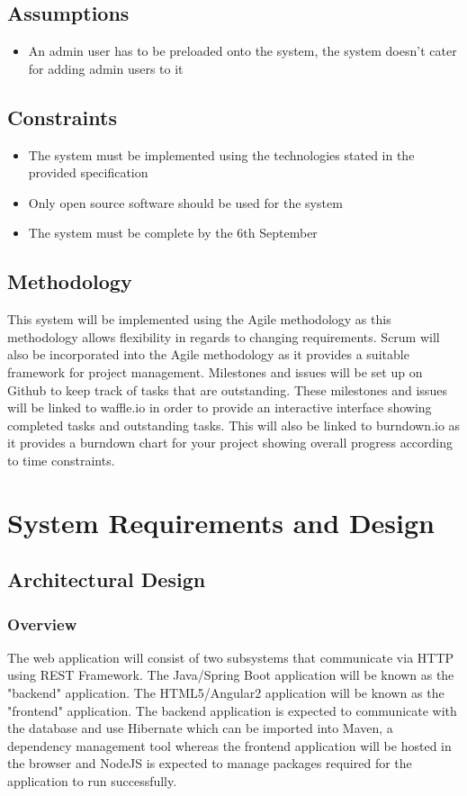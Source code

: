 \documentclass[a4paper,10pt]{article}
\begin{document}
\subsection{Assumptions}
\begin{itemize}
	\item An admin user has to be preloaded onto the system, the system doesn’t cater for adding admin users to it
\end{itemize}

\subsection{Constraints}
\begin{itemize}
	\item The system must be implemented using the technologies stated in the provided specification
	\item Only open source software should be used for the system
	\item The system must be complete by the 6th September
\end{itemize}

\subsection{Methodology}
This system will be implemented using the Agile methodology as this methodology allows flexibility in regards to changing requirements. Scrum will also be incorporated into the Agile methodology as it provides a suitable framework for project management. Milestones and issues will be set up on Github to keep track of tasks that are outstanding. These milestones and issues will be linked to waffle.io in order to provide an interactive interface showing completed tasks and outstanding tasks. This will also be linked to burndown.io as it provides a burndown chart for your project showing overall progress according to time constraints.

\section{System Requirements and Design}
\subsection {Architectural Design}
\subsubsection{Overview}
The web application will consist of two subsystems that communicate via HTTP using REST Framework. The Java/Spring Boot application will be known as the "backend" application. The HTML5/Angular2 application will be known as the "frontend" application. The backend application is expected to communicate with the database and use Hibernate which can be imported into Maven, a dependency management tool whereas the frontend application will be hosted in the browser and NodeJS is expected to manage packages required for the application to run successfully.
\end{document}
